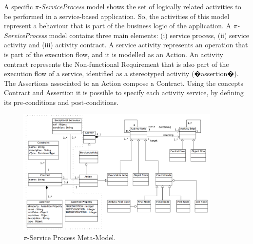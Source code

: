 A specific \textit{$\pi$-ServiceProcess} model shows the set of logically related activities to be performed in a service-based application. 
So, the activities of this model represent a behaviour that is part of the business logic of the application. 
A \textit{$\pi$-ServiceProcess}  model contains three main elements: (i) service process, (ii) service activity and (iii) activity contract. A service activity represents an operation that is part of the execution flow, and it is modelled as an {\sc Action}. 
An activity contract represents the {\sc Non-functional Requirement}  that is also part of the execution flow of a service, identified  as a stereotyped activity ({\sf �assertion�}). 
The {\sc Assertion}s associated to an {\sc Action} compose a {\sc Contract}. Using the concepts {\sc Contract} and {\sc Assertion} it is possible to specify each activity service, by defining its pre-conditions and post-conditions.

\begin{figure}[htpb]
\center
\includegraphics[width=0.9\textwidth]{figs/ServiceProcessMetaModel.pdf}
\caption{\label{fig:CIM:serviceprocessmetamodel} $\pi$-Service Process Meta-Model.}
\end{figure}


